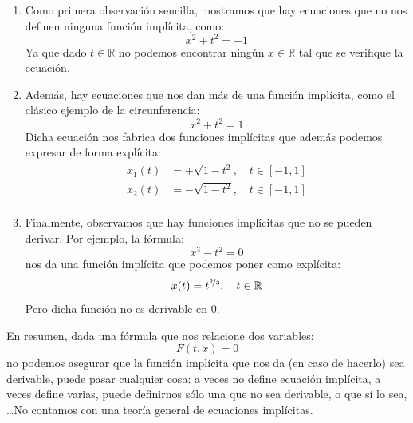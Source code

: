 \begin{enumerate}
    \item Como primera observación sencilla, mostramos que hay ecuaciones que no nos definen ninguna función implícita, como:
        \begin{equation*}
            x^2+t^2 = -1
        \end{equation*}
        Ya que dado $t\in \mathbb{R}$ no podemos encontrar ningún $x\in \mathbb{R}$ tal que se verifique la ecuación.

    \item Además, hay ecuaciones que nos dan más de una función implícita, como el clásico ejemplo de la circunferencia:
        \begin{equation*}
            x^2 + t^2 = 1
        \end{equation*}
        Dicha ecuación nos fabrica dos funciones implícitas que además podemos expresar de forma explícita:
        \begin{align*}
            x_1(t) &= +\sqrt{1-t^2}, \quad t\in [-1,1] \\
            x_2(t) &= -\sqrt{1-t^2}, \quad t\in [-1,1] \\
        \end{align*}

    \item Finalmente, observamos que hay funciones implícitas que no se pueden derivar. Por ejemplo, la fórmula:
        \begin{equation*}
            x^3-t^2 = 0
        \end{equation*}
        nos da una función implícita que podemos poner como explícita:
        \begin{equation*}
            x(t) = t^{\nicefrac{2}{3}}, \quad t\in \mathbb{R}
        \end{equation*}
        Pero dicha función no es derivable en 0.
\end{enumerate}

En resumen, dada una fórmula que nos relacione dos variables:
\begin{equation*}
    F(t,x) = 0
\end{equation*}
no podemos asegurar que la función implícita que nos da (en caso de hacerlo) sea derivable, puede pasar cualquier cosa: a veces no define ecuación implícita, a veces define varias, puede definirnos sólo una que no sea derivable, o que sí lo sea, \ldots No contamos con una teoría general de ecuaciones implícitas.\\

